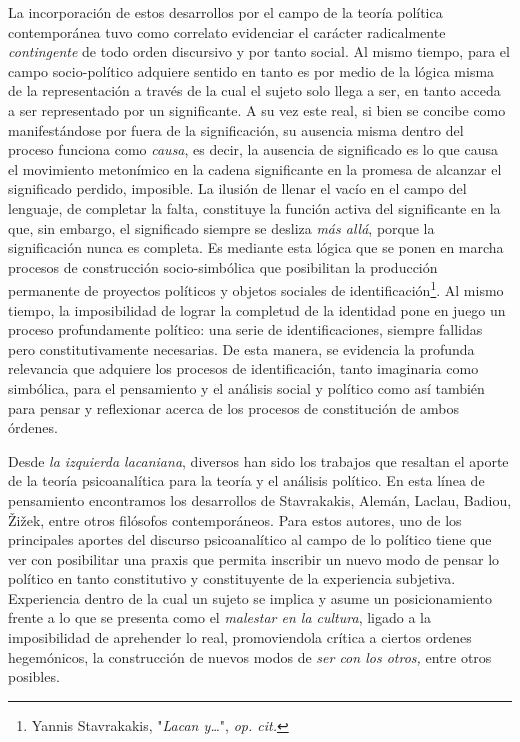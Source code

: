 \documentclass{book}
\begin{document}
La incorporación de estos desarrollos por el campo de la teoría política
contemporánea tuvo como correlato evidenciar el carácter radicalmente
\emph{contingente} de todo orden discursivo y por tanto social. Al mismo
tiempo, para el campo socio-político adquiere sentido en tanto es por
medio de la lógica misma de la representación a través de la cual el
sujeto solo llega a ser, en tanto acceda a ser representado por un
significante. A su vez este real, si bien se concibe como manifestándose
por fuera de la significación, su ausencia misma dentro del proceso
funciona como \emph{causa}, es decir, la ausencia de significado es lo
que causa el movimiento metonímico en la cadena significante en la
promesa de alcanzar el significado perdido, imposible. La ilusión de
llenar el vacío en el campo del lenguaje, de completar la falta,
constituye la función activa del significante en la que, sin embargo, el
significado siempre se desliza \emph{más allá}, porque la significación
nunca es completa. Es mediante esta lógica que se ponen en marcha
procesos de construcción socio-simbólica que posibilitan la producción
permanente de proyectos políticos y objetos sociales de
identificación\footnote{Yannis Stavrakakis, "\emph{Lacan y\ldots{}}",
  \emph{op. cit.}}. Al mismo tiempo, la imposibilidad de lograr la
completud de la identidad pone en juego un proceso profundamente
político: una serie de identificaciones, siempre fallidas pero
constitutivamente necesarias. De esta manera, se evidencia la profunda
relevancia que adquiere los procesos de identificación, tanto imaginaria
como simbólica, para el pensamiento y el análisis social y político como
así también para pensar y reflexionar acerca de los procesos de
constitución de ambos órdenes.

Desde \emph{la izquierda lacaniana}, diversos han sido los trabajos que
resaltan el aporte de la teoría psicoanalítica para la teoría y el
análisis político. En esta línea de pensamiento encontramos los
desarrollos de Stavrakakis, Alemán, Laclau, Badiou, Žižek, entre otros
filósofos contemporáneos. Para estos autores, uno de los principales
aportes del discurso psicoanalítico al campo de lo político tiene que
ver con posibilitar una praxis que permita inscribir un nuevo modo de
pensar lo político en tanto constitutivo y constituyente de la
experiencia subjetiva. Experiencia dentro de la cual un sujeto se
implica y asume un posicionamiento frente a lo que se presenta como el
\emph{malestar en la cultura}, ligado a la imposibilidad de aprehender
lo real, promoviendola crítica a ciertos ordenes hegemónicos, la
construcción de nuevos modos de \emph{ser con los otros,} entre otros
posibles.
\end{document}
